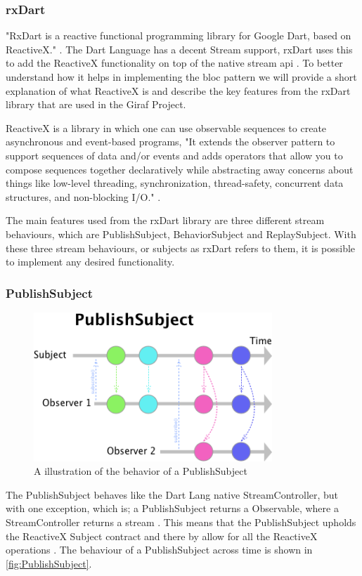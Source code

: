 \subsubsection{rxDart}
"RxDart is a reactive functional programming library for Google Dart, based on ReactiveX." \cite{rxDart}. The Dart Language has a decent Stream support, rxDart uses this to add the ReactiveX functionality on top of the native stream api \cite{rxDart}. To better understand how it helps in implementing the \gls{bloc} pattern we will provide a short explanation of what ReactiveX is and describe the key features from the rxDart library that are used in the Giraf Project.

ReactiveX is a library in which one can use observable sequences to create asynchronous and event-based programs, "It extends the observer pattern to support sequences of data and/or events and adds operators that allow you to compose sequences together declaratively while abstracting away concerns about things like low-level threading, synchronization, thread-safety, concurrent data structures, and non-blocking I/O." \cite{ReactiveXWebsite}.

The main features used from the rxDart library are three different stream behaviours, which are PublishSubject, BehaviorSubject and ReplaySubject. With these three stream behaviours, or subjects as rxDart refers to them, it is possible to implement any desired functionality.

\subsubsection*{PublishSubject}
\begin{figure}[h]
    \centering
    \includegraphics[width=0.8\textwidth]{figures/PublishSubject.png}
    \caption{A illustration of the behavior of a PublishSubject}
    \label{fig:PublishSubject}
\end{figure}
The PublishSubject behaves like the Dart Lang native StreamController, but with one exception, which is; a PublishSubject returns a Observable, where a StreamController returns a stream \cite{PublishSubject}. This means that the PublishSubject upholds the ReactiveX Subject contract and there by allow for all the ReactiveX operations \cite{PublishSubject}. The behaviour of a PublishSubject across time is shown in \autoref{fig:PublishSubject}.

